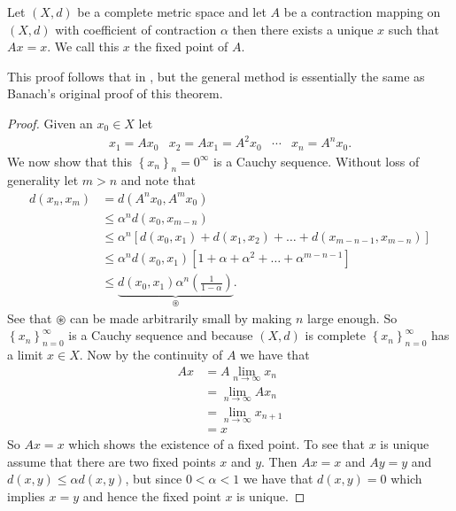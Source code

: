 \documentclass{article}
\begin{document}
\begin{theorem}
	Let $ (X,d) $ be a complete metric space and let $ A $ be a contraction mapping on $ (X, d) $ with 
	coefficient of contraction $ \alpha $ then 
	there exists a unique $ x $ such that $ Ax = x $. We call this $ x $ the fixed point of $ A $. 
\end{theorem}
This proof follows that in \cite{Kolmogorov1975}, but the general method is essentially the same as Banach's
original proof of this theorem.
\begin{proof}
	Given an $ x_0 \in X $ let
	\begin{align*}
		x_1 = Ax_0 & x_2 = Ax_1 = A^2x_0 & \cdots & x_n = A^n x_0.
	\end{align*}
	We now show that this $ \left\{ x_n \right\}_n=0^\infty $ is a Cauchy sequence.
	Without loss of generality  let $m > n $ and note that
	\begin{align*}
		d(x_n, x_m) &= d(A^nx_0, A^mx_0) \\
			&\leq \alpha^n d(x_0, x_{m-n}) \\
			&\leq \alpha^n \left[ d(x_0, x_1) + d(x_1, x_2) + \ldots + d(x_{m-n-1}, x_{m-n}) \right] \\
			&\leq \alpha^n d(x_0, x_1) \left[ 1 + \alpha + \alpha^2 + \ldots + \alpha^{m-n-1} \right] \\
			&\leq \underbrace{d(x_0, x_1) \alpha^n \left( \frac{1}{1-\alpha} \right)}_{\circledast}.
	\end{align*}
	See that $ \circledast $ can be made arbitrarily small by making $ n $ large enough. So $ \left\{ x_n \right\}_{n=0}^\infty $
	is a Cauchy sequence and because $ (X, d) $ is complete $ \left\{ x_n \right\}_{n=0}^\infty  $ has a limit $ x \in X $.
	Now by the continuity of $ A $ we have that 
	\begin{align*}
		Ax &= A \lim_{n\longrightarrow \infty} x_n \\
			&= \lim_{n \longrightarrow \infty} Ax_n \\
			&= \lim_{n \longrightarrow \infty} x_{n+1} \\
			&= x
	\end{align*}
	So $ Ax = x $ which shows the existence of a fixed point. To see that $ x $ is unique assume that there
	are two fixed points $ x $ and $ y $. Then $ Ax = x $ and $ Ay = y $
	and $ d(x,y) \leq \alpha d(x,y) $, but since $ 0 < \alpha < 1 $ we have that $ d(x,y) = 0 $ which implies
	$ x = y $ and hence the fixed point $ x $ is unique.
\end{proof}
\end{document}
